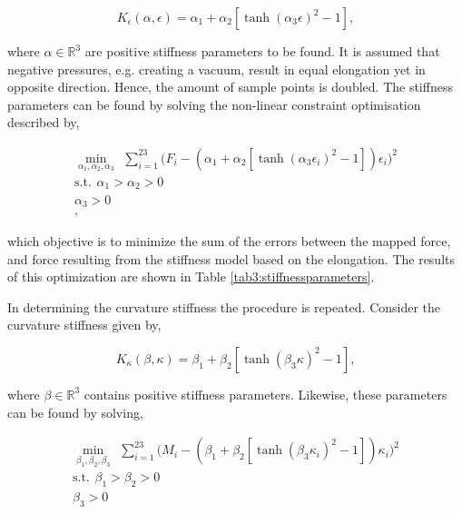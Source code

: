 \begin{equation}
    K_\epsilon(\alpha,\epsilon) =  \alpha_1 + \alpha_2 [\tanh({\alpha_3 \epsilon})^2 -1],
\end{equation}


where $\alpha \in \mathbb{R}^3$ are positive stiffness parameters to be found. It is assumed that negative pressures, e.g. creating a vacuum, result in equal elongation yet in opposite direction. Hence, the amount of sample points is doubled. The stiffness parameters can be found by solving the non-linear constraint optimisation described by,


\begin{equation}
\begin{aligned}
\min_{\alpha_1,\alpha_2,\alpha_3} \hspace{5pt} \sum_{i=1}^{23}\Big(F_i -  (\alpha_1 + \alpha_2 [\tanh({\alpha_3 \epsilon_i})^2 -1])\epsilon_i\Big)^2    \\ 
\text{s.t.} \hspace{5pt} \alpha_1 > \alpha_2 > 0 \\
\alpha_3 > 0 \\ ,
\label{eq3:Keopt}
\end{aligned}
\end{equation}

which objective is to minimize the sum of the errors between the mapped force, and force resulting from the stiffness model based on the elongation. The results of this optimization are shown in Table \ref{tab3:stiffnessparameters}.

In determining the curvature stiffness the procedure is repeated. Consider the curvature stiffness given by,

\begin{equation}
    K_\kappa(\beta,\kappa) =  \beta_1 + \beta_2 [\tanh({\beta_3 \kappa})^2 -1],
\end{equation}

where $\beta \in \mathbb{R}^3$ contains positive stiffness parameters. Likewise, these parameters can be found by solving,

\begin{equation}
\begin{aligned}
\min_{\beta_1,\beta_2,\beta_3} \hspace{5pt} \sum_{i=1}^{23}\big(M_i -  (\beta_1 + \beta_2 [\tanh({\beta_3 {\kappa_i}})^2 -1]){\kappa_i}\Big)^2    \\ 
\text{s.t.} \hspace{5pt} \beta_1 > \beta_2 > 0 \\
\beta_3 > 0 \\ 
\label{eq3:Kkopt}
\end{aligned}
\end{equation}

